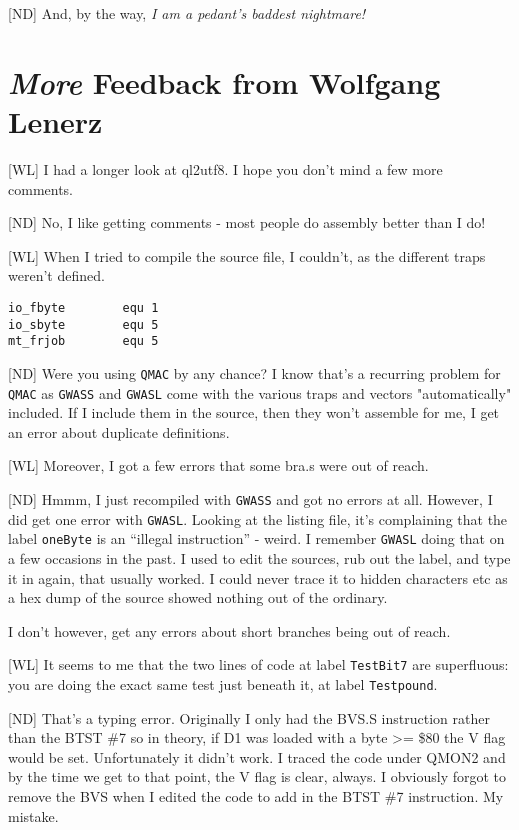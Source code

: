 [ND] And, by the way, \emph{I am a pedant's baddest nightmare!}


\section{\emph{More} Feedback from Wolfgang Lenerz}


[WL] I had a longer look at ql2utf8. I hope you don't mind a few more comments.

[ND] No, I like getting comments - most people do assembly better than I do!

[WL] When I tried to compile the source file, I couldn't, as the different traps weren't defined.

\begin{lstlisting}[numbers=none]
io_fbyte        equ 1
io_sbyte        equ 5
mt_frjob        equ 5
\end{lstlisting}

[ND] Were you using \texttt{QMAC} by any chance? I know that's a recurring problem for \texttt{QMAC} as \texttt{GWASS} and \texttt{GWASL} come with the various traps and vectors "automatically" included. If I include them in the source, then they won't assemble for me, I get an error about duplicate definitions.


[WL] Moreover, I got a few errors that some bra.s  were out of reach.

[ND] Hmmm, I just recompiled with \texttt{GWASS} and got no errors at all. However, I did get one error with \texttt{GWASL}. Looking at the listing file, it's complaining that the label \texttt{oneByte} is an ``illegal instruction'' - weird. I remember \texttt{GWASL} doing that on a few occasions in the past. I used to edit the sources, rub out the label, and type it in again, that usually worked. I could never trace it to hidden characters etc as a hex dump of the source showed nothing out of the ordinary.

I don't however, get any errors about short branches being out of reach. 


[WL] It seems to me that the two lines of code at label \texttt{TestBit7} are superfluous: you are doing the exact same test just beneath it, at label \texttt{Testpound}.

[ND] That's a typing error. Originally I only had the BVS.S instruction rather than the BTST \#7 so in theory, if D1 was loaded with a byte >= \$80 the V flag would be set. Unfortunately it didn't work. I traced the code under QMON2 and by the time we get to that point, the V flag is clear, always. I obviously forgot to remove the BVS when I edited the code to add in the BTST \#7 instruction. My mistake.


